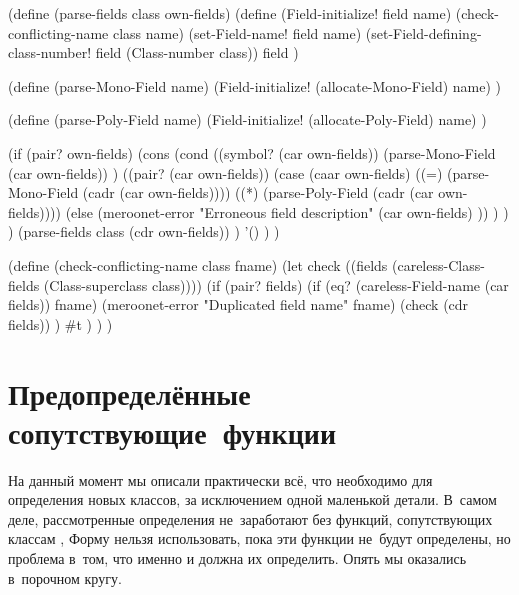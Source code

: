 \begin{code:lisp}
(define (parse-fields class own-fields)
  (define (Field-initialize! field name)
    (check-conflicting-name class name)
    (set-Field-name! field name)
    (set-Field-defining-class-number! field (Class-number class))
    field )

  (define (parse-Mono-Field name)
    (Field-initialize! (allocate-Mono-Field) name) )

  (define (parse-Poly-Field name)
    (Field-initialize! (allocate-Poly-Field) name) )

  (if (pair? own-fields)
      (cons (cond
             ((symbol? (car own-fields))
              (parse-Mono-Field (car own-fields)) )
             ((pair? (car own-fields))
              (case (caar own-fields)
                ((=) (parse-Mono-Field (cadr (car own-fields))))
                ((*) (parse-Poly-Field (cadr (car own-fields))))
                (else (meroonet-error
                       "Erroneous field description"
                       (car own-fields) )) ) ) )
            (parse-fields class (cdr own-fields)) )
      '() ) )

(define (check-conflicting-name class fname)
  (let check ((fields (careless-Class-fields (Class-superclass class))))
    (if (pair? fields)
        (if (eq? (careless-Field-name (car fields)) fname)
            (meroonet-error "Duplicated field name" fname)
            (check (cdr fields)) )
        #t ) ) )
\end{code:lisp}


\section{Предопределённые сопутствующие~функции}%
\label{objects/sect:predef-accomp}

На данный момент мы описали практически всё, что необходимо для определения
новых классов, за исключением одной маленькой детали. В~самом деле,
рассмотренные определения не~заработают без функций, сопутствующих классам
,  {\itd} Форму  нельзя использовать,
пока эти функции не~будут определены, но проблема в~том, что именно
 и должна их определить. Опять мы оказались в~порочном кругу.

